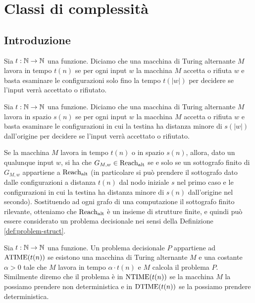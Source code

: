 \chapter{Classi di complessità}

\section{Introduzione}

\begin{definizione}
 Sia $t:\mathbb{N}\to\mathbb{N}$ una funzione. Diciamo che una macchina di Turing alternante
 $M$ lavora in tempo $t(n)$ se per ogni input $w$ la macchina $M$ accetta o
 rifiuta $w$ e basta esaminare le configurazioni solo fino la tempo $t(|w|)$
 per decidere se l'input verrà accettato o rifiutato.
\end{definizione}

\begin{definizione}
 Sia $t:\mathbb{N}\to\mathbb{N}$ una funzione. Diciamo che una macchina di Turing alternante
 $M$ lavora in spazio $s(n)$ se per ogni input $w$
 la macchina $M$ accetta o
 rifiuta $w$ e basta esaminare le configurazioni in cui la testina
 ha distanza minore di $s(|w|)$ dall'origine
 per decidere se l'input verrà accettato o rifiutato.
\end{definizione}

\begin{osservazione}
 Se la macchina $M$ lavora in tempo $t(n)$ o in spazio $s(n)$, allora,
 dato un qualunque input $w$, si ha che $G_{M,w} \in \operatorname{Reach_{alt}}$ se e solo se
 un sottografo finito di $G_{M,w}$ appartiene a $\operatorname{Reach_{alt}}$ (in particolare si può
 prendere il sottografo dato dalle configurazioni a distanza $t(n)$ dal nodo
 iniziale $s$ nel primo caso e le configurazioni in cui la testina ha distanza minore
 di $s(n)$ dall'origine nel secondo). Sostituendo ad ogni grafo di una computazione
 il sottografo finito rilevante, otteniamo che $\operatorname{Reach_{alt}}$ è un insieme di strutture
 finite, e quindi può essere considerato un problema decisionale nei sensi della
 Definizione \ref{def:problem-struct}.
\end{osservazione}


\begin{definizione}
 Sia $t:\mathbb{N}\to\mathbb{N}$ una funzione.
 Un problema decisionale $P$ appartiene ad $\operatorname{ATIME}(t(n))$ se esistono una macchina
 di Turing alternante $M$ e una costante $\alpha>0$ tale che $M$ lavora in tempo
 $\alpha \cdot t(n)$ e $M$ calcola il problema $P$. Similmente diremo che
 il problema è in $\operatorname{NTIME}(t(n))$ se la macchina $M$ la possiamo prendere non
 deterministica e in $\operatorname{DTIME}(t(n))$ se la possiamo prendere deterministica.
\end{definizione}

